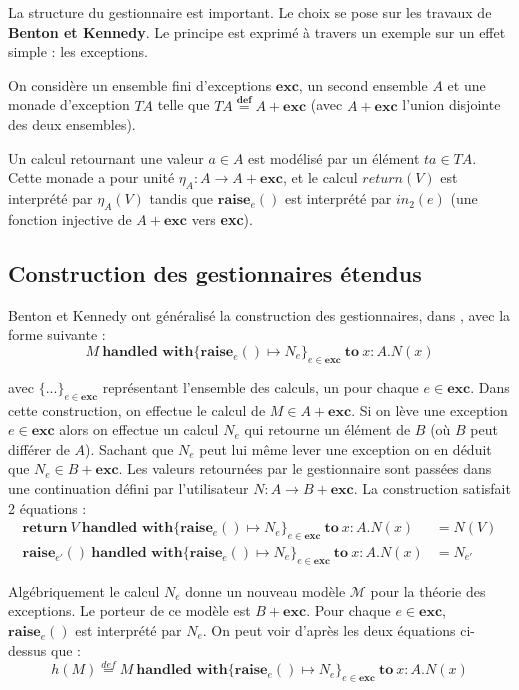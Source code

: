 
La structure du gestionnaire est important. Le choix se pose sur les travaux de \textbf{Benton et Kennedy}. Le principe est exprimé à travers un exemple sur un effet simple : les exceptions.
\medbreak

On considère un ensemble fini d'exceptions $\textbf{exc}$, un second ensemble $A$ et 
une monade d'exception $TA$ telle que $TA \overset{\textbf{def}}{=} A + \textbf{exc}$ 
(avec $A + \textbf{exc}$ l'union disjointe des deux ensembles). 

Un calcul retournant une valeur $a \in A$ est modélisé par un élément $ta \in TA$. 
Cette monade a pour unité $\eta_A : A \rightarrow A + \textbf{exc}$, et le calcul 
$return(V)$ est interprété par $\eta_A(V)$ tandis que $\textbf{raise}_e()$ est 
interprété par $in_2(e)$ (une fonction injective de $A + \textbf{exc}$ vers \textbf{exc}).

\subsection{Construction des gestionnaires étendus}

	Benton et Kennedy ont généralisé la construction des gestionnaires, dans \cite{DBLP:journals/jfp/BentonK01}, avec la forme suivante :
	\[M~\textbf{handled~with} \{\textbf{raise}_e() \mapsto N_e\}_{e \in \textbf{exc}}~\textbf{to}~ x:A.N(x)\]
	
	avec $\{...\}_{e \in \textbf{exc}}$ représentant l'ensemble des calculs, un pour chaque $e \in \textbf{exc}$. Dans cette construction, 
	on effectue le calcul de $M \in A + \textbf{exc}$. Si on lève une exception 
	$e \in \textbf{exc}$ alors on effectue un calcul $N_e$ qui retourne un élément de $B$
	(où $B$ peut différer de $A$). Sachant que $N_e$ peut lui même lever une exception 
	on en déduit que $N_e \in B + \textbf{exc}$. Les valeurs retournées par le gestionnaire sont passées dans une continuation défini par l'utilisateur $N : A \rightarrow B + \textbf{exc}$. La construction satisfait 2 équations :
	\begin{align*}
		\textbf{return} ~V~\textbf{handled~with} \{\textbf{raise}_e() \mapsto N_e\}_{e \in \textbf{exc}}~\textbf{to}~ x:A.N(x) &= N(V)\\
		\textbf{raise}_{e'}()~\textbf{handled~with} \{\textbf{raise}_e() \mapsto N_e\}_{e \in \textbf{exc}}~\textbf{to}~ x:A.N(x) &= N_{e'}
	\end{align*}
	
	Algébriquement le calcul $N_e$ donne un nouveau modèle $\mathcal{M}$ pour la théorie des exceptions. Le porteur de ce modèle est $B + \textbf{exc}$. Pour chaque $e \in \textbf{exc}$, $\textbf{raise}_e()$ est interprété par $N_e$. On peut voir d'après les deux équations ci-dessus que :
	\[h(M) \overset{def}{=} M~\textbf{handled~with} \{\textbf{raise}_e() \mapsto N_e\}_{e \in \textbf{exc}}~\textbf{to}~ x:A.N(x)\]
	
